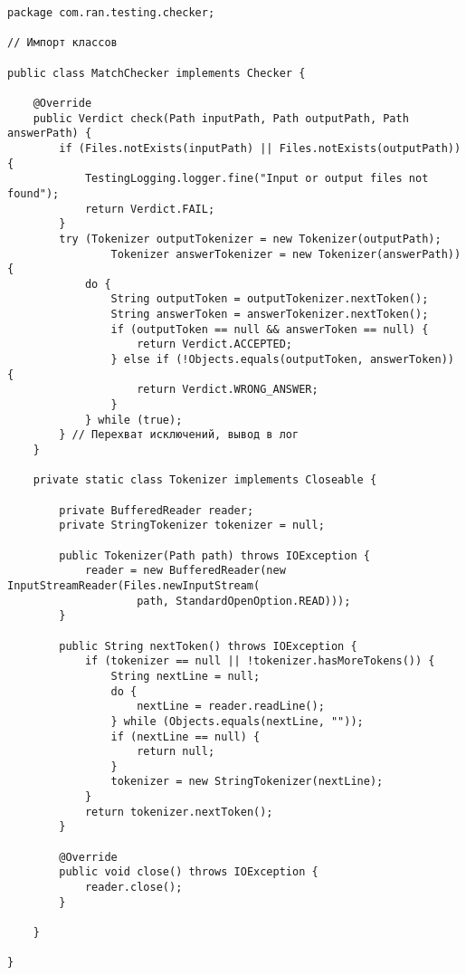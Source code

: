 \begin{verbatim}
package com.ran.testing.checker;

// Импорт классов

public class MatchChecker implements Checker {
    
    @Override
    public Verdict check(Path inputPath, Path outputPath, Path answerPath) {
        if (Files.notExists(inputPath) || Files.notExists(outputPath)) {
            TestingLogging.logger.fine("Input or output files not found");
            return Verdict.FAIL;
        }
        try (Tokenizer outputTokenizer = new Tokenizer(outputPath);
                Tokenizer answerTokenizer = new Tokenizer(answerPath)) {
            do {
                String outputToken = outputTokenizer.nextToken();
                String answerToken = answerTokenizer.nextToken();
                if (outputToken == null && answerToken == null) {
                    return Verdict.ACCEPTED;
                } else if (!Objects.equals(outputToken, answerToken)) {
                    return Verdict.WRONG_ANSWER;
                }
            } while (true);
        } // Перехват исключений, вывод в лог
    }
    
    private static class Tokenizer implements Closeable {

        private BufferedReader reader;
        private StringTokenizer tokenizer = null;
        
        public Tokenizer(Path path) throws IOException {
            reader = new BufferedReader(new InputStreamReader(Files.newInputStream(
                    path, StandardOpenOption.READ)));
        }
        
        public String nextToken() throws IOException {
            if (tokenizer == null || !tokenizer.hasMoreTokens()) {
                String nextLine = null;
                do {
                    nextLine = reader.readLine();
                } while (Objects.equals(nextLine, ""));
                if (nextLine == null) {
                    return null;
                }
                tokenizer = new StringTokenizer(nextLine);
            }
            return tokenizer.nextToken();
        }
        
        @Override
        public void close() throws IOException {
            reader.close();
        }
        
    }
    
}
\end{verbatim}